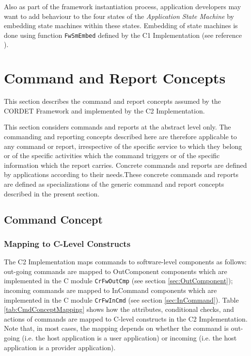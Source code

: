 \documentclass[a4paper,10pt]{article}
\let\stdsection\section
\renewcommand\section{\newpage\stdsection}
\begin{document}
Also as part of the framework instantiation process, application developers may want to add behaviour to the four states of the \textit{Application State Machine} by embedding state machines within these states. Embedding of state machines is done using function \texttt{FwSmEmbed} defined by the C1 Implementation (see reference \cite{ref:C1Implementation}).

\section{Command and Report Concepts}\label{sec:CmdAndRepModel}
This section describes the command and report concepts assumed by the CORDET Framework and implemented by the C2 Implementation. 

This section considers commands and reports at the abstract level only. The commanding and reporting concepts described here are therefore applicable to any command or report, irrespective of the specific service to which they belong or of the specific activities which the command triggers or of the specific information which the report carries. Concrete commands and reports are defined by applications according to their needs.These concrete commands and reports are defined as specializations of the generic command and report concepts described in the present section. 

\subsection{Command Concept }\label{sec:CmdConcept}


\subsubsection{Mapping to C-Level Constructs}\label{sec:CmdConceptMapping}
The C2 Implementation maps commands to software-level components as follows: out-going commands are mapped to OutComponent components which are implemented in the C module \texttt{CrFwOutCmp} (see section \ref{sec:OutComponent}); incoming commands are mapped to InCommand components which are implemented in the C module \texttt{CrFwInCmd} (see section \ref{sec:InCommand}). Table \ref{tab:CmdConceptMapping} shows how the attributes, conditional checks, and actions of commands are mapped to C-level constructs in the C2 Implementation. Note that, in most cases, the mapping depends on whether the command is out-going (i.e. the host application is a user application) or incoming (i.e. the host application is a provider application).
\end{document}
